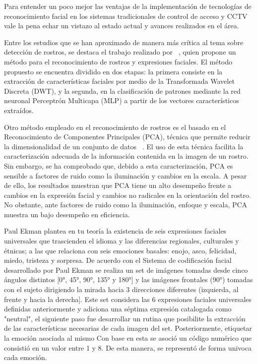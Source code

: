 Para entender un poco mejor las ventajas de la implementación de tecnologías de reconocimiento facial en los sistemas tradicionales de control de acceso y CCTV vale la pena echar un vistazo al estado actual y avances realizados en el área.


Entre los estudios que se han aproximado de manera más crítica al tema sobre detección de rostros, se destaca el trabajo realizado por ~\cite{D3}, quien propone un método para el reconocimiento de rostros y expresiones faciales. El método propuesto se encuentra dividido en dos etapas: la primera consiste en la extracción de características faciales por medio de la Transformada Wavelet Discreta (DWT), y la segunda, en la clasificación de patrones mediante la red neuronal Perceptrón Multicapa (MLP) a partir de los vectores característicos extraídos.

Otro método empleado en el reconocimiento de rostros es el basado en el Reconocimiento de Componentes Principales (PCA), técnica que permite reducir la dimensionalidad de un conjunto de datos ~\cite{D4}. El uso de esta técnica facilita la caracterización adecuada de la información contenida en la imagen de un rostro. Sin embargo, se ha comprobado que, debido a esta caracterización, PCA es sensible a factores de ruido como la iluminación y cambios en la escala. A pesar de ello, los resultados muestran que PCA tiene un alto desempeño frente a cambios en la expresión facial y cambios no radicales en la orientación del rostro. No obstante, ante factores de ruido como la iluminación, enfoque y escala, PCA muestra un bajo desempeño en eficiencia. 

Paul Ekman plantea en tu teoría la existencia de seis expresiones faciales universales que trascienden el idioma y las diferencias regionales, culturales y étnicas; a las que relaciona con seis emociones basales: enojo, asco, felicidad, miedo, tristeza y sorpresa. De acuerdo con el Sistema de codificación facial ~\cite{Website} desarrollado por Paul Ekman se realiza un set de imágenes tomadas desde cinco ángulos distintos [0°, 45°, 90°, 135° y 180°] y las imágenes frontales (90°) tomadas con el sujeto dirigiendo la mirada hacia 3 direcciones diferentes (izquierda, al frente y hacia la derecha]. Este set considera las 6 expresiones faciales universales definidas anteriormente y adiciona una séptima expresión catalogada como "neutral", el siguiente paso fue desarrollar un rutina que posibilite la extracción de las características necesarias de cada imagen del set. 
Posteriormente, etiquetar la emoción asociada al mismo Con base en esta se asoció un código numérico que consistió en un valor entre 1 y 8. De esta manera, se representó de forma univoca cada emoción. 

